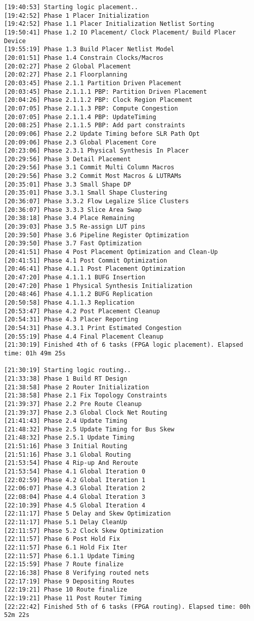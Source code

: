 \begin{center}
\begin{lstlisting}[label=lst:vlog,caption=Файл v++\_vinc.log]
[19:40:53] Starting logic placement..
[19:42:52] Phase 1 Placer Initialization
[19:42:52] Phase 1.1 Placer Initialization Netlist Sorting
[19:50:41] Phase 1.2 IO Placement/ Clock Placement/ Build Placer Device
[19:55:19] Phase 1.3 Build Placer Netlist Model
[20:01:51] Phase 1.4 Constrain Clocks/Macros
[20:02:27] Phase 2 Global Placement
[20:02:27] Phase 2.1 Floorplanning
[20:03:45] Phase 2.1.1 Partition Driven Placement
[20:03:45] Phase 2.1.1.1 PBP: Partition Driven Placement
[20:04:26] Phase 2.1.1.2 PBP: Clock Region Placement
[20:07:05] Phase 2.1.1.3 PBP: Compute Congestion
[20:07:05] Phase 2.1.1.4 PBP: UpdateTiming
[20:08:25] Phase 2.1.1.5 PBP: Add part constraints
[20:09:06] Phase 2.2 Update Timing before SLR Path Opt
[20:09:06] Phase 2.3 Global Placement Core
[20:23:06] Phase 2.3.1 Physical Synthesis In Placer
[20:29:56] Phase 3 Detail Placement
[20:29:56] Phase 3.1 Commit Multi Column Macros
[20:29:56] Phase 3.2 Commit Most Macros & LUTRAMs
[20:35:01] Phase 3.3 Small Shape DP
[20:35:01] Phase 3.3.1 Small Shape Clustering
[20:36:07] Phase 3.3.2 Flow Legalize Slice Clusters
[20:36:07] Phase 3.3.3 Slice Area Swap
[20:38:18] Phase 3.4 Place Remaining
[20:39:03] Phase 3.5 Re-assign LUT pins
[20:39:50] Phase 3.6 Pipeline Register Optimization
[20:39:50] Phase 3.7 Fast Optimization
[20:41:51] Phase 4 Post Placement Optimization and Clean-Up
[20:41:51] Phase 4.1 Post Commit Optimization
[20:46:41] Phase 4.1.1 Post Placement Optimization
[20:47:20] Phase 4.1.1.1 BUFG Insertion
[20:47:20] Phase 1 Physical Synthesis Initialization
[20:48:46] Phase 4.1.1.2 BUFG Replication
[20:50:58] Phase 4.1.1.3 Replication
[20:53:47] Phase 4.2 Post Placement Cleanup
[20:54:31] Phase 4.3 Placer Reporting
[20:54:31] Phase 4.3.1 Print Estimated Congestion
[20:55:19] Phase 4.4 Final Placement Cleanup
[21:30:19] Finished 4th of 6 tasks (FPGA logic placement). Elapsed time: 01h 49m 25s 

[21:30:19] Starting logic routing..
[21:33:38] Phase 1 Build RT Design
[21:38:58] Phase 2 Router Initialization
[21:38:58] Phase 2.1 Fix Topology Constraints
[21:39:37] Phase 2.2 Pre Route Cleanup
[21:39:37] Phase 2.3 Global Clock Net Routing
[21:41:43] Phase 2.4 Update Timing
[21:48:32] Phase 2.5 Update Timing for Bus Skew
[21:48:32] Phase 2.5.1 Update Timing
[21:51:16] Phase 3 Initial Routing
[21:51:16] Phase 3.1 Global Routing
[21:53:54] Phase 4 Rip-up And Reroute
[21:53:54] Phase 4.1 Global Iteration 0
[22:02:59] Phase 4.2 Global Iteration 1
[22:06:07] Phase 4.3 Global Iteration 2
[22:08:04] Phase 4.4 Global Iteration 3
[22:10:39] Phase 4.5 Global Iteration 4
[22:11:17] Phase 5 Delay and Skew Optimization
[22:11:17] Phase 5.1 Delay CleanUp
[22:11:57] Phase 5.2 Clock Skew Optimization
[22:11:57] Phase 6 Post Hold Fix
[22:11:57] Phase 6.1 Hold Fix Iter
[22:11:57] Phase 6.1.1 Update Timing
[22:15:59] Phase 7 Route finalize
[22:16:38] Phase 8 Verifying routed nets
[22:17:19] Phase 9 Depositing Routes
[22:19:21] Phase 10 Route finalize
[22:19:21] Phase 11 Post Router Timing
[22:22:42] Finished 5th of 6 tasks (FPGA routing). Elapsed time: 00h 52m 22s 


\end{lstlisting}
\end{center}
